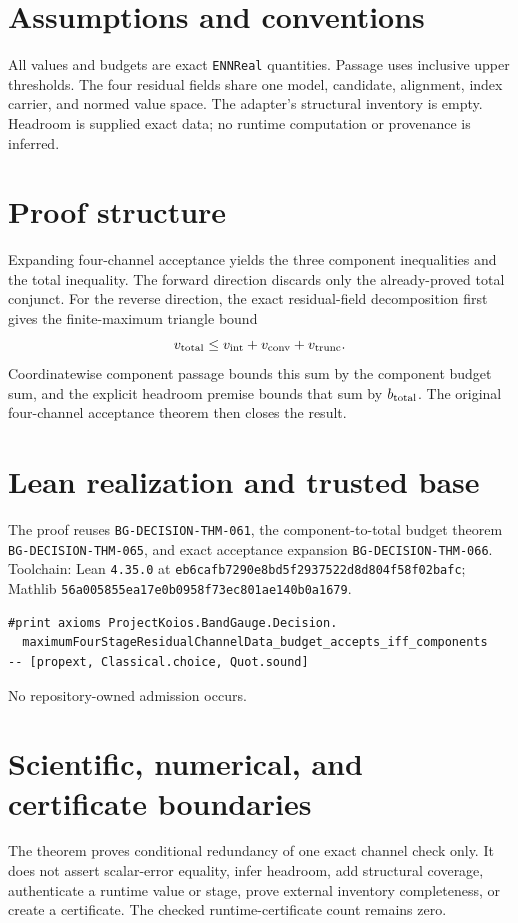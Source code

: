 \documentclass[11pt]{article}
\begin{document}
\section{Assumptions and conventions}
All values and budgets are exact \texttt{ENNReal} quantities. Passage uses inclusive upper
thresholds. The four residual fields share one model, candidate, alignment, index carrier, and normed
value space. The adapter's structural inventory is empty. Headroom is supplied exact data; no
runtime computation or provenance is inferred.

\section{Proof structure}
Expanding four-channel acceptance yields the three component inequalities and the total inequality.
The forward direction discards only the already-proved total conjunct. For the reverse direction,
the exact residual-field decomposition first gives the finite-maximum triangle bound
\[
 v_{\rm total}\le v_{\rm int}+v_{\rm conv}+v_{\rm trunc}.
\]
Coordinatewise component passage bounds this sum by the component budget sum, and the explicit
headroom premise bounds that sum by $b_{\rm total}$. The original four-channel acceptance theorem
then closes the result.

\section{Lean realization and trusted base}
The proof reuses \texttt{BG-DECISION-THM-061}, the component-to-total budget theorem
\texttt{BG-DECISION-THM-065}, and exact acceptance expansion
\texttt{BG-DECISION-THM-066}. Toolchain: Lean \texttt{4.35.0} at
\texttt{eb6cafb7290e8bd5f2937522d8d804f58f02bafc}; Mathlib
\texttt{56a005855ea17e0b0958f73ec801ae140b0a1679}.
\begin{verbatim}
#print axioms ProjectKoios.BandGauge.Decision.
  maximumFourStageResidualChannelData_budget_accepts_iff_components
-- [propext, Classical.choice, Quot.sound]
\end{verbatim}
No repository-owned admission occurs.

\section{Scientific, numerical, and certificate boundaries}
The theorem proves conditional redundancy of one exact channel check only. It does not assert
scalar-error equality, infer headroom, add structural coverage, authenticate a runtime value or
stage, prove external inventory completeness, or create a certificate. The checked
runtime-certificate count remains zero.
\end{document}
